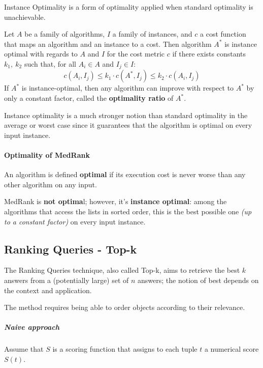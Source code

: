 \documentclass[english]{article}
\begin{document}
Instance Optimality is a form of optimality applied when standard optimality is unachievable.

Let \(A\) be a family of algorithms, \(I\) a family of instances, and \(c\) a cost function that maps an algorithm and an instance to a cost.
Then algorithm \(A^\ast\) is instance optimal with regards to \(A\) and \(I\) for the cost metric \(c\) if there exists constants \(k_1, \ k_2\) such that, for all \(A_i \in A\) and \(I_j \in I\):
\[ c\left( A_i, I_j \right) \leq k_1 \cdot c\left( A^\ast, I_j \right) \leq k_2 \cdot c\left( A_i, I_j \right) \]
If \(A^\ast\) is instance-optimal, then any algorithm can improve with respect to \(A^\ast\) by only a constant factor, called the \textbf{optimality ratio} of \(A^\ast\).

Instance optimality is a much stronger notion than standard optimality in the average or worst case since it guarantees that the algorithm is optimal on every input instance.

\paragraph{Optimality of MedRank}

An algorithm is defined \textbf{optimal} if its execution cost is never worse than any other algorithm on any input.

MedRank is \textbf{not optima}l;
however, it's \textbf{instance optimal}:
among the algorithms that access the lists in sorted order, this is the best possible one \textit{(up to a constant factor)} on every input instance.

\subsection{Ranking Queries - Top-k}

The Ranking Queries technique, also called Top-k, aims to retrieve the best \(k\) answers from a (potentially large) set of \(n\) answers;
the notion of best depends on the context and application.

The method requires being able to order objects according to their relevance.

\subparagraph*{Naive approach}
Assume that \(S\) is a scoring function that assigns to each tuple \(t\) a numerical score \(S(t)\).
\end{document}
